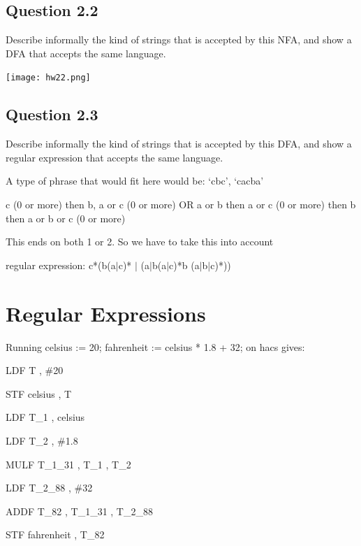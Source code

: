 \documentclass[11pt, oneside]{article}   	%
\begin{document}
\subsection{Question 2.2}
\par Describe informally the kind of strings that is accepted by this NFA, and show a DFA that accepts the same language.
\par \texttt{[image: hw22.png]}

\subsection{Question 2.3}
\par Describe informally the kind of strings that is accepted by this DFA, and show a regular expression that accepts the same language.
\par A type of phrase that would fit here would be: `cbc', `cacba'
\par c (0 or more) then b, a or c (0 or more) OR a or b then a or c (0 or more) then b then a or b or c (0 or more)
\par This ends on both 1 or 2. So we have to take this into account
\par regular expression: c*(b(a$|$c)* $|$ (a$|$b(a$|$c)*b (a$|$b$|$c)*))

\section{Regular Expressions}
\par Running { celsius := 20; fahrenheit := celsius * 1.8 + 32; } on hacs gives:
\par LDF T ,  \#20
\par STF celsius , T  
\par LDF T\_1 ,  celsius    
\par LDF T\_2 ,  \#1.8    
\par MULF  T\_1\_31   ,  T\_1   ,  T\_2    
\par LDF T\_2\_88 ,  \#32    
\par ADDF  T\_82   ,  T\_1\_31   ,  T\_2\_88    
\par STF fahrenheit , T\_82
\end{document}
